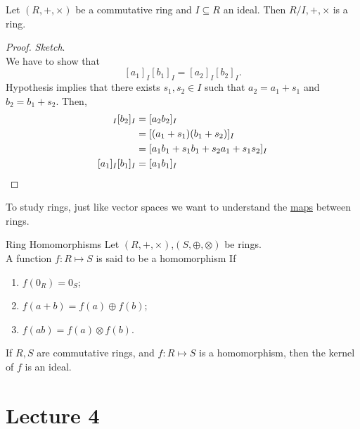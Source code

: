 \documentclass[twoside, openright, fontsize=10pt, headings=big]{scrbook}
\begin{document}
\begin{proposition}{}{}
    Let $(R,+,\times)$ be a commutative ring and $I\subseteq R$ an ideal. Then $R/I,+,\times$ is a ring.
\end{proposition}
\begin{proof}
    \textit{Sketch}.\\
    We have to show that 
    \[
        [a_1]_I[b_1]_I=[a_2]_I[b_2]_I.
    \]
    Hypothesis implies that there exists $s_1,s_2\in I$ such that $a_2=a_1+s_1$ and $b_2=b_1+s_2$. Then,
    \begin{align*}
        [a_2]_I[b_2]_I&=[a_2b_2]_I\\
        &=[(a_1+s_1)(b_1+s_2)]_I\\
        &=[a_1b_1+s_1b_1+s_2a_1+s_1s_2]_I\\
        [a_1]_I[b_1]_I&=[a_1b_1]_I\qedhere
    \end{align*}    
\end{proof}
To study rings, just like vector spaces we want to understand the \underline{maps} between rings.
\begin{definition}{Ring Homomorphisms}{}
    Let $(R,+,\times)$,$(S,\oplus,\otimes)$ be rings.\\
    A function $f:R\mapsto S$ is said to be a homomorphism If
    \begin{enumerate}
        \item $f(0_R)=0_S$;
        \item $f(a+b)=f(a)\oplus f(b)$;
        \item $f(ab)=f(a)\otimes f(b)$.
    \end{enumerate}
\end{definition}
\begin{important}
    If $R,S$ are commutative rings, and $f:R\mapsto S$ is a homomorphism, then the kernel of $f$ is an ideal.
\end{important}

\chapter{Lecture 4}
\end{document}

